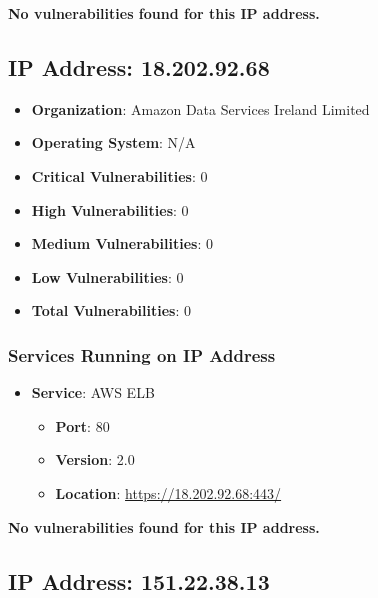 \documentclass{article}
\begin{document}
\textbf{No vulnerabilities found for this IP address.}




\clearpage



\subsection{IP Address: 18.202.92.68}

\begin{itemize}
    \item \textbf{Organization}: Amazon Data Services Ireland Limited
    \item \textbf{Operating System}:  N/A 
    \item \textbf{Critical Vulnerabilities}: 0
    \item \textbf{High Vulnerabilities}: 0
    \item \textbf{Medium Vulnerabilities}: 0
    \item \textbf{Low Vulnerabilities}: 0
    \item \textbf{Total Vulnerabilities}: 0
\end{itemize}

\subsubsection*{Services Running on IP Address}

\begin{itemize}
    
        \item \textbf{Service}: AWS ELB
        \begin{itemize}
            \item \textbf{Port}: 80
            \item \textbf{Version}:  2.0 
            \item \textbf{Location}: \href{ https://18.202.92.68:443/ }{ https://18.202.92.68:443/ }
        \end{itemize}
    
\end{itemize}


\textbf{No vulnerabilities found for this IP address.}




\clearpage



\subsection{IP Address: 151.22.38.13}
\end{document}
